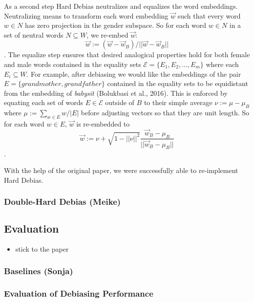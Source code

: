\documentclass[
  english,
  man,floatsintext]{apa6}
\providecommand{\tightlist}{%
  \setlength{\itemsep}{0pt}\setlength{\parskip}{0pt}}
\begin{document}
As a second step Hard Debias neutralizes and equalizes the word embeddings. Neutralizing means to transform each word embedding \(\vec{w}\) such that every word \(w\in N\) has zero projection in the gender subspace. So for each word \(w\in N\) in a set of neutral words \(N \subseteq W\), we re-embed \(\vec{w}\): \[\vec{w}:=(\vec{w}-\vec{w}_B)/||\vec{w}-\vec{w}_B||\]. The equalize step ensures that desired analogical properties hold for both female and male words contained in the equality sets \(\mathcal{E}=\{E_1,E_2,...,E_m\}\) where each \(E_i \subseteq W\). For example, after debiasing we would like the embeddings of the pair \(E=\{grandmother, grandfather\}\) contained in the equality sets to be equidistant from the embedding of \emph{babysit} (Bolukbasi et al., 2016). This is enforced by equating each set of words \(E\in \mathcal{E}\) outside of \(B\) to their simple average \(\nu:=\mu-\mu_B\) where \(\mu:=\sum_{w\in E}w/|E|\) before adjusting vectors so that they are unit length. So for each word \(w\in E\), \(\vec{w}\) is re-embedded to \[\vec{w}:=\nu+\sqrt{1-||\nu||^2}\frac{\vec{w}_B-\mu_B}{||\vec{w}_B-\mu_B||}\].

With the help of the original paper, we were successfully able to re-implement Hard Debias.

\hypertarget{double-hard-debias-meike}{%
\subsubsection{Double-Hard Debias (Meike)}\label{double-hard-debias-meike}}

\hypertarget{evaluation}{%
\subsection{Evaluation}\label{evaluation}}

\begin{itemize}
\tightlist
\item
  stick to the paper
\end{itemize}

\hypertarget{baselines-sonja}{%
\subsubsection{Baselines (Sonja)}\label{baselines-sonja}}

\hypertarget{evaluation-of-debiasing-performance}{%
\subsubsection{Evaluation of Debiasing Performance}\label{evaluation-of-debiasing-performance}}
\end{document}
